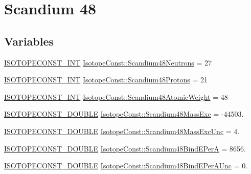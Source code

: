 \hypertarget{group___isotope_const-_scandium-_sc48}{}\section{Scandium 48}
\label{group___isotope_const-_scandium-_sc48}
\subsection*{Variables}
\begin{DoxyCompactItemize}
\item 
\mbox{\hyperlink{group___isotope_const-_macros_ga5f18360b3e99483a35c32d789e62621c}{I\+S\+O\+T\+O\+P\+E\+C\+O\+N\+S\+T\+\_\+\+I\+NT}} \mbox{\hyperlink{group___isotope_const-_scandium-_sc48_ga47013b13dadf6c60e89cac7a027f2065}{Isotope\+Const\+::\+Scandium48\+Neutrons}} = 27
\item 
\mbox{\hyperlink{group___isotope_const-_macros_ga5f18360b3e99483a35c32d789e62621c}{I\+S\+O\+T\+O\+P\+E\+C\+O\+N\+S\+T\+\_\+\+I\+NT}} \mbox{\hyperlink{group___isotope_const-_scandium-_sc48_ga30505588717a9759e5b57f88038a2f1e}{Isotope\+Const\+::\+Scandium48\+Protons}} = 21
\item 
\mbox{\hyperlink{group___isotope_const-_macros_ga5f18360b3e99483a35c32d789e62621c}{I\+S\+O\+T\+O\+P\+E\+C\+O\+N\+S\+T\+\_\+\+I\+NT}} \mbox{\hyperlink{group___isotope_const-_scandium-_sc48_ga34315db0c1d7a8a7ded1264133db2ff6}{Isotope\+Const\+::\+Scandium48\+Atomic\+Weight}} = 48
\item 
\mbox{\hyperlink{group___isotope_const-_macros_ga8f45a7272ce02c0b4c65c44636ed719a}{I\+S\+O\+T\+O\+P\+E\+C\+O\+N\+S\+T\+\_\+\+D\+O\+U\+B\+LE}} \mbox{\hyperlink{group___isotope_const-_scandium-_sc48_ga87f2b80ac32f5457a25d3e1066917e34}{Isotope\+Const\+::\+Scandium48\+Mass\+Exc}} = -\/44503.
\item 
\mbox{\hyperlink{group___isotope_const-_macros_ga8f45a7272ce02c0b4c65c44636ed719a}{I\+S\+O\+T\+O\+P\+E\+C\+O\+N\+S\+T\+\_\+\+D\+O\+U\+B\+LE}} \mbox{\hyperlink{group___isotope_const-_scandium-_sc48_gac5f5e44ecd383d9ef2b50af40ba31371}{Isotope\+Const\+::\+Scandium48\+Mass\+Exc\+Unc}} = 4.
\item 
\mbox{\hyperlink{group___isotope_const-_macros_ga8f45a7272ce02c0b4c65c44636ed719a}{I\+S\+O\+T\+O\+P\+E\+C\+O\+N\+S\+T\+\_\+\+D\+O\+U\+B\+LE}} \mbox{\hyperlink{group___isotope_const-_scandium-_sc48_ga560f09fa8203bf6786b9b551bfae9f76}{Isotope\+Const\+::\+Scandium48\+Bind\+E\+PerA}} = 8656.
\item 
\mbox{\hyperlink{group___isotope_const-_macros_ga8f45a7272ce02c0b4c65c44636ed719a}{I\+S\+O\+T\+O\+P\+E\+C\+O\+N\+S\+T\+\_\+\+D\+O\+U\+B\+LE}} \mbox{\hyperlink{group___isotope_const-_scandium-_sc48_gaf7df68d094207c944437d2876bc9ca8b}{Isotope\+Const\+::\+Scandium48\+Bind\+E\+Per\+A\+Unc}} = 0.

\end{DoxyCompactItemize}
